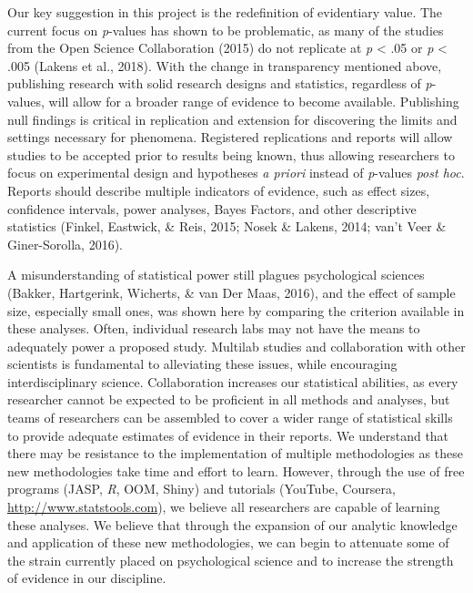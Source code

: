 \documentclass[,man, mask]{apa6}
\begin{document}
Our key suggestion in this project is the redefinition of evidentiary value. The current focus on \emph{p}-values has shown to be problematic, as many of the studies from the Open Science Collaboration (2015) do not replicate at \emph{p} \textless{} .05 or \emph{p} \textless{} .005 (Lakens et al., 2018). With the change in transparency mentioned above, publishing research with solid research designs and statistics, regardless of \emph{p}-values, will allow for a broader range of evidence to become available. Publishing null findings is critical in replication and extension for discovering the limits and settings necessary for phenomena. Registered replications and reports will allow studies to be accepted prior to results being known, thus allowing researchers to focus on experimental design and hypotheses \emph{a priori} instead of \emph{p}-values \emph{post hoc}. Reports should describe multiple indicators of evidence, such as effect sizes, confidence intervals, power analyses, Bayes Factors, and other descriptive statistics (Finkel, Eastwick, \& Reis, 2015; Nosek \& Lakens, 2014; van't Veer \& Giner-Sorolla, 2016).

A misunderstanding of statistical power still plagues psychological sciences (Bakker, Hartgerink, Wicherts, \& van Der Maas, 2016), and the effect of sample size, especially small ones, was shown here by comparing the criterion available in these analyses. Often, individual research labs may not have the means to adequately power a proposed study. Multilab studies and collaboration with other scientists is fundamental to alleviating these issues, while encouraging interdisciplinary science. Collaboration increases our statistical abilities, as every researcher cannot be expected to be proficient in all methods and analyses, but teams of researchers can be assembled to cover a wider range of statistical skills to provide adequate estimates of evidence in their reports. We understand that there may be resistance to the implementation of multiple methodologies as these new methodologies take time and effort to learn. However, through the use of free programs (JASP, \emph{R}, OOM, Shiny) and tutorials (YouTube, Coursera, \url{http://www.statstools.com}), we believe all researchers are capable of learning these analyses. We believe that through the expansion of our analytic knowledge and application of these new methodologies, we can begin to attenuate some of the strain currently placed on psychological science and to increase the strength of evidence in our discipline.
\end{document}
